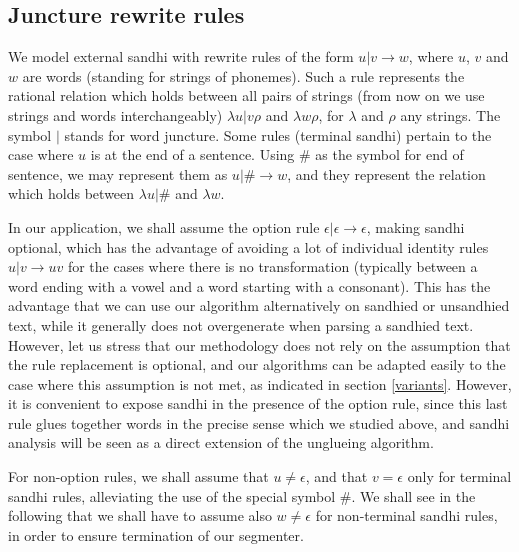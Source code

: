 
\subsection{Juncture rewrite rules}

We model external sandhi with rewrite rules of the form 
$u|v\rightarrow w$, where $u$, $v$ and $w$ are words (standing for
strings of phonemes). Such a rule represents the rational relation which
holds between all pairs of strings (from now on we use strings and
words interchangeably) $\lambda u | v \rho$ and $\lambda w \rho$, for 
$\lambda$ and $\rho$ any strings. 
The symbol $|$ stands for word juncture.
Some rules (terminal sandhi) pertain to the case where $u$ is at the end
of a sentence. Using  $\#$ as the symbol for end of sentence, we may 
represent them as $u|\#\rightarrow w$, and they represent the relation
which holds between $\lambda u|\#$ and $\lambda w$. 

In our application, we shall assume the option rule 
$\epsilon|\epsilon\rightarrow\epsilon$, making sandhi optional, which has
the advantage of avoiding a lot of individual identity rules
$u|v\rightarrow u v$ for the cases where there is no transformation (typically
between a word ending with a vowel and a word starting with a consonant).
This has the advantage that we can use our algorithm alternatively on 
sandhied or unsandhied text, while it generally does 
not overgenerate when parsing a sandhied text. However, let us stress that
our methodology does not rely on the assumption that the rule replacement
is optional, and our algorithms can be adapted easily to the case where this
assumption is not met, as indicated in section \ref{variants}. 
However, it is convenient to expose sandhi in the presence of the option
rule, since this last rule glues together words in the precise sense which
we studied above, and sandhi analysis will be seen as a direct
extension of the unglueing algorithm.

For non-option rules, we shall assume %
that $u\neq\epsilon$, and that $v=\epsilon$ only for terminal sandhi rules,
alleviating the use of the special symbol $\#$. 
We shall see in the following that we shall have to assume also 
$w\neq\epsilon$ for non-terminal sandhi rules,
in order to ensure termination of our segmenter. 

